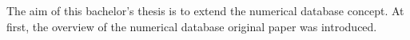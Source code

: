 The aim of this bachelor's thesis is to extend the numerical database concept. At first, the overview of the numerical database original paper\cite{park90} was introduced.

